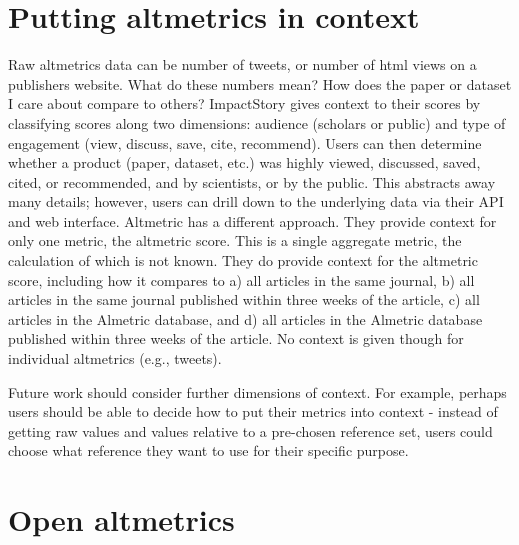 \documentclass[letterpaper,superscriptaddress,showkeys,longbibliography]{revtex4-1}\usepackage{graphicx, color}
\begin{document}
\section*{Putting altmetrics in context}

Raw altmetrics data can be number of tweets, or number of html views on a publishers website. What do these numbers mean? How does the paper or dataset I care about compare to others? ImpactStory gives context to their scores by classifying scores along two dimensions: audience (scholars or public) and type of engagement (view, discuss, save, cite, recommend). Users can then determine whether a product (paper, dataset, etc.) was highly viewed, discussed, saved, cited, or recommended, and by scientists, or by the public. This abstracts away many details; however, users can drill down to the underlying data via their API and web interface.  Altmetric has a different approach. They provide context for only one metric, the altmetric score. This is a single aggregate metric, the calculation of which is not known. They do provide context for the altmetric score, including how it compares to a) all articles in the same journal, b) all articles in the same journal published within three weeks of the article, c) all articles in the Almetric database, and d) all articles in the Almetric database published within three weeks of the article. No context is given though for individual altmetrics (e.g., tweets). 

Future work should consider further dimensions of context. For example, perhaps users should be able to decide how to put their metrics into context - instead of getting raw values and values relative to a pre-chosen reference set, users could choose what reference they want to use for their specific purpose.  


\section{Open altmetrics}
\end{document}
